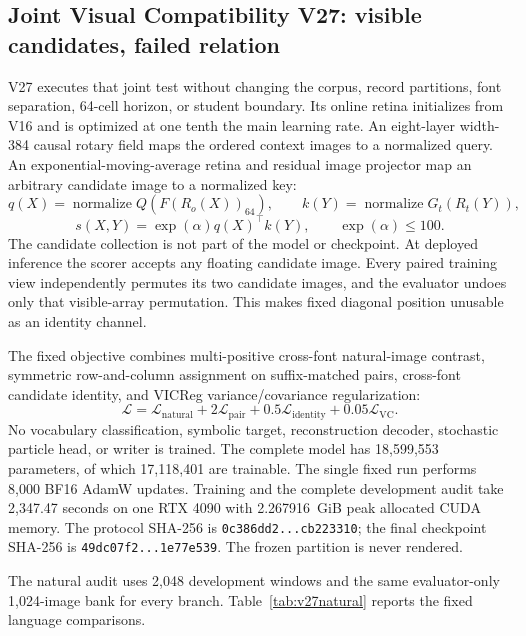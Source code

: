 \documentclass[11pt]{article}
\begin{document}
\clearpage
\subsection{Joint Visual Compatibility V27: visible candidates, failed relation}

V27 executes that joint test without changing the corpus, record partitions,
font separation, 64-cell horizon, or student boundary. Its online retina
initializes from V16 and is optimized at one tenth the main learning rate. An
eight-layer width-384 causal rotary field maps the ordered context images to a
normalized query. An exponential-moving-average retina and residual image
projector map an arbitrary candidate image to a normalized key:
\[
q(X)=\operatorname{normalize}Q(F(R_o(X))_{64}),\qquad
k(Y)=\operatorname{normalize}G_t(R_t(Y)),
\]
\[
s(X,Y)=\exp(\alpha)q(X)^\top k(Y),\qquad \exp(\alpha)\leq100.
\]
The candidate collection is not part of the model or checkpoint. At deployed
inference the scorer accepts any floating candidate image. Every paired
training view independently permutes its two candidate images, and the
evaluator undoes only that visible-array permutation. This makes fixed diagonal
position unusable as an identity channel.

The fixed objective combines multi-positive cross-font natural-image contrast,
symmetric row-and-column assignment on suffix-matched pairs, cross-font
candidate identity, and VICReg variance/covariance regularization:
\[
\mathcal L=\mathcal L_{\mathrm{natural}}
+2\mathcal L_{\mathrm{pair}}
+0.5\mathcal L_{\mathrm{identity}}
+0.05\mathcal L_{\mathrm{VC}}.
\]
No vocabulary classification, symbolic target, reconstruction decoder,
stochastic particle head, or writer is trained. The complete model has
18,599,553 parameters, of which 17,118,401 are trainable. The single fixed run
performs 8,000 BF16 AdamW updates. Training and the complete development audit
take 2,347.47 seconds on one RTX 4090 with 2.267916~GiB peak allocated CUDA
memory. The protocol SHA-256 is \texttt{0c386dd2...cb223310}; the final
checkpoint SHA-256 is \texttt{49dc07f2...1e77e539}. The frozen partition is
never rendered.

The natural audit uses 2,048 development windows and the same evaluator-only
1,024-image bank for every branch. Table~\ref{tab:v27natural} reports the fixed
language comparisons.
\end{document}
